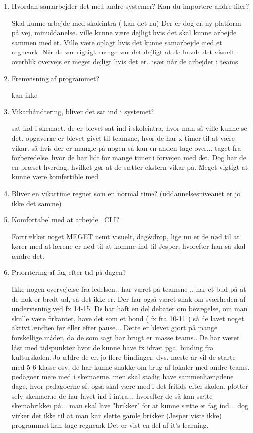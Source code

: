 \begin{enumerate}
	
	\item Hvordan samarbejder det med andre systemer? Kan du importere andre filer?
	
	Skal kunne arbejde med skoleintra ( kan det nu) Der er dog en ny platform på vej, minuddanelse. ville kunne være dejligt hvis det skal kunne arbejde sammen med et. Ville være oplagt hvis det kunne samarbejde med et regneark. Når de var rigtigt mange var det dejligt at de havde det visuelt. overblik overvejs er meget dejligt hvis det er.. især når de arbejder i teams
	
	\item Fremvisning af programmet?
	
	kan ikke
	
	\item Vikarhåndtering, bliver det sat ind i systemet?
	
	sat ind i skemaet. de er blevet sat ind i skoleintra, hvor man så ville kunne se det. opgaverne er blevet givet til teamsne, hvor de har x timer til at være vikar. så hvis der er mangle på nogen så kan en anden tage over... taget fra forberedelse, hvor de har lidt for mange timer i forvejen med det. Dog har de en præset hverdag, hvilket gør at de sætter ekstern vikar på. Meget vigtigt at kunne være komfertible med 
	
	\item Bliver en vikartime regnet som en normal time? (uddannelsesniveauet er jo ikke det samme)
	
	
	
	\item Komfortabel med at arbejde i CLI?
	
	Fortrækker noget MEGET nemt visuelt, dag&drop, lige nu er de nød til at kører med at lærene er nød til at komme ind til Jesper, hvorefter han så skal ændre det.  
	
	\item Prioritering af fag efter tid på dagen?
	
	Ikke nogen overvejelse fra ledelsen.. har været på teamsne .. har et bud på at de nok er bredt ud, så det ikke er. Der har også været snak om sværheden af undervisning ved fx 14-15. De har haft en del debater om bevægelse, om man skulle være firkantet, have det som et bond ( fx fra 10-11 )  så de lavet noget aktivt ændten før eller efter pause... Dette er blevet gjort på mange forskellige måder, da de som sagt har brugt en masse teams.. De har været låst med tidspunkter hvor de kunne have fx idræt pga. binding fra kulturskolen. Jo ældre de er, jo flere bindinger.  dvs. næste år vil de starte med 5-6 klasse osv. de har kunne snakke om brug af lokaler med andre teams. pedagoer mere med i skemaerne. men skal stadig have sammenhængdene dage, hvor pedagoerne sf. også skal være med i det fritids efter skolen. plotter selv skemaerne de har lavet ind i intra... hvorefter de så kan sætte skemabrikker på... man skal lave "brikker" for at kunne sætte et fag ind... dog virker det ikke til at man kan slette gamle brikker (Jesper viste ikke)
	programmet kan tage regneark Det er vist en del af it's learning. 


\end{enumerate}
